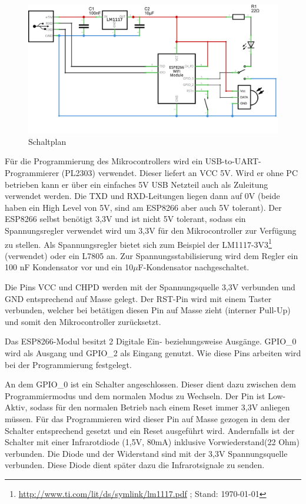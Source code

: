 \begin{figure}[h]
	\centering
	\includegraphics[scale=1.4]{Abbildungen/ESP8266_Schaltplan}
	\caption{Schaltplan}
	\label{fig:Schalplan}
\end{figure}

Für die Programmierung des Mikrocontrollers wird ein USB-to-\acs{UART}-Programmierer (PL2303) verwendet.
Dieser liefert an \acs{VCC} 5V. 
Wird er ohne PC betrieben kann er über ein einfaches 5V USB Netzteil auch als Zuleitung verwendet werden. Die \acs{TXD} und \acs{RXD}-Leitungen liegen dann auf 0V (beide haben ein High Level von 5V, sind am ESP8266 aber auch 5V tolerant).
Der ESP8266 selbst benötigt 3,3V und ist nicht 5V tolerant, sodass ein Spannungsregler verwendet wird um 3,3V für den Mikrocontroller zur Verfügung zu stellen.
Als Spannungsregler bietet sich zum Beispiel der LM1117-3V3\footnote{\url{http://www.ti.com/lit/ds/symlink/lm1117.pdf} ; Stand: \today} (verwendet) oder ein L7805 an.
Zur Spannungsstabilisierung wird dem Regler ein 100 nF Kondensator vor und ein 10$\mu$F-Kondensator nachgeschaltet.

Die Pins \acs{VCC} und \acs{CHPD} werden mit der Spannungsquelle 3,3V verbunden und \ac{GND} entsprechend auf Masse gelegt.
Der \acs{RST}-Pin wird mit einem Taster verbunden, welcher bei betätigen diesen Pin auf Masse zieht (interner Pull-Up) und somit den Mikrocontroller zurücksetzt.

Das ESP8266-Modul besitzt 2 Digitale Ein- beziehungsweise Ausgänge. \acs{GPIO}\_0 wird als Ausgang und \acs{GPIO}\_2 als Eingang genutzt.
Wie diese Pins arbeiten wird bei der Programmierung festgelegt.

An dem {GPIO}\_0 ist ein Schalter angeschlossen.
Dieser dient dazu zwischen dem Programmiermodus und dem normalen Modus zu Wechseln.
Der Pin ist Low-Aktiv, sodass für den normalen Betrieb nach einem Reset immer 3,3V anliegen müssen.
Für das Programmieren wird dieser Pin auf Masse gezogen in dem der Schalter entsprechend gesetzt und ein Reset ausgeführt wird.
Andernfalls ist der Schalter mit einer Infrarotdiode (1,5V, 80mA) inklusive Vorwiederstand(22 Ohm) verbunden.
Die Diode und der Widerstand sind mit der 3,3V Spannungsquelle verbunden.
Diese Diode dient später dazu die Infrarotsignale zu senden.

